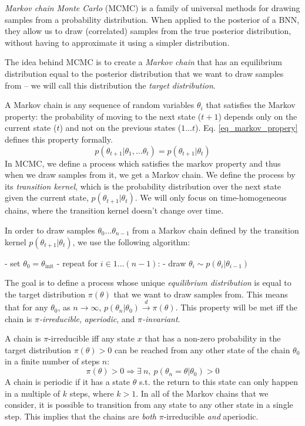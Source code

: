 \documentclass[12pt]{article}
\begin{document}
\textit{Markov chain Monte Carlo} (MCMC) is a family of universal methods for drawing samples from a probability distribution. When applied to the posterior of a BNN, they allow us to draw (correlated) samples from the true posterior distribution, without having to approximate it using a simpler distribution.

The idea behind MCMC is to create a \textit{Markov chain} that has an equilibrium distribution equal to the posterior distribution that we want to draw samples from -- we will call this distribution the \textit{target distribution}.

A Markov chain is any sequence of random variables $\theta_i$ that satisfies the Markov property: the probability of moving to the next state ($t+1$) depends only on the current state ($t$) and not on the previous states ($1 \ldots t$). Eq. \ref{eq_markov_propery} defines this property formally.
$$
p(\theta_{t+1}|\theta_1,\ldots \theta_t)=p(\theta_{t+1}|\theta_t)
$$
In MCMC, we define a process which satisfies the markov property and thus when we draw samples from it, we get a Markov chain. We define the process by its \textit{transition kernel}, which is the probability distribution over the next state given the current state, $p(\theta_{t+1}|\theta_t)$. We will only focus on time-homogeneous chains, where the transition kernel doesn't change over time.

In order to draw samples $\theta_0 \ldots \theta_{n-1}$ from a Markov chain defined by the transition kernel $p(\theta_{t+1}|\theta_t)$, we use the following algorithm:

- set $\theta_0 = \theta_{\textrm{init}}$
- repeat for $i \in 1 \ldots (n-1)$:
  - draw $\theta_i \sim p(\theta_i|\theta_{i-1})$

The goal is to define a process whose unique \textit{equilibrium distribution} is equal to the target distribution $\pi(\theta)$ that we want to draw samples from. This means that for any $\theta_0$, as $n \rightarrow \infty$, $p(\theta_n|\theta_0) \xrightarrow{d} \pi(\theta)$. This property will be met iff the chain is \textit{$\pi$-irreducible}, \textit{aperiodic}, and \textit{$\pi$-invariant}.

A chain is $\pi$-irreducible iff any state $x$ that has a non-zero probability in the target distribution $\pi(\theta) > 0$ can be reached from any other state of the chain $\theta_0$ in a finite number of steps $n$:
$$
\pi(\theta) > 0 \Rightarrow \exists \ n, \ p(\theta_n = \theta|\theta_0) > 0
$$
A chain is periodic if it has a state $\theta$ s.t. the return to this state can only happen in a multiple of $k$ steps, where $k > 1$. In all of the Markov chains that we consider, it is possible to transition from any state to any other state in a single step. This implies that the chains are \textit{both} $\pi$-irreducible \textit{and} aperiodic.
\end{document}
